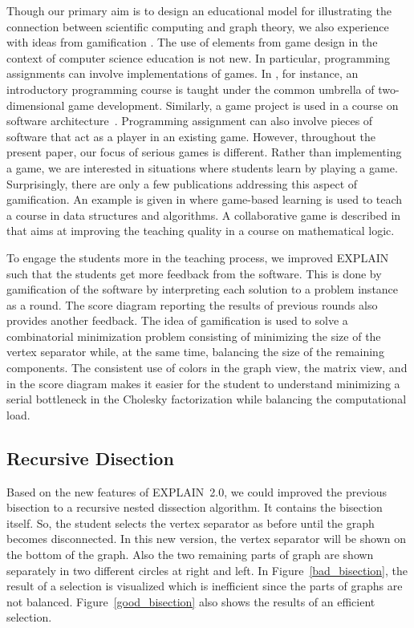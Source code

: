 \documentclass[12pt, oneside]{book}
\begin{document}
Though our primary aim is to design an educational model for illustrating the connection between
scientific computing and graph theory, we also experience with ideas from gamification
\cite{deterding2011:gug,deterding2011}. The use of elements from game design in the context of
computer science education is not new. In particular, programming assignments can involve
implementations of games. In \cite{la2007:gfa}, for instance, an introductory programming course is
taught under the common umbrella of two-dimensional game development. Similarly, a game project is
used in a course on software architecture~\cite{Wang2011:EEU}. Programming assignment can also
involve pieces of software that act as a player in an existing game. However, throughout the
present paper, our focus of serious games is different. Rather than implementing a game, we are
interested in situations where students learn by playing a game. Surprisingly, there are only a few
publications addressing this aspect of gamification. An example is given in
\cite{Hakulinen2011:usg} where game-based learning is used to teach a course in data structures and
algorithms. A collaborative game is described in \cite{shl:bsc} that aims at improving the teaching
quality in a course on mathematical logic.


To engage the students more in the teaching process, we improved EXPLAIN such that the students get
more feedback from the software. This is done by gamification of the software by interpreting each
solution to a problem instance as a round. The score diagram reporting the results of previous
rounds also provides another feedback. The idea of gamification is used to solve a combinatorial
minimization problem consisting of minimizing the size of the vertex separator while, at the same
time, balancing the size of the remaining components. The consistent use of colors in the graph
view, the matrix view, and in the score diagram makes it easier for the student to understand
minimizing a serial bottleneck in the Cholesky factorization while balancing the computational
load.
\subsection{Recursive Disection}
Based on the new features of \mbox{EXPLAIN 2.0}, we could improved the previous
bisection to a recursive nested dissection algorithm. 
It contains the bisection itself. So, the student selects the vertex separator
as before until the graph becomes disconnected. 
In this new version, the vertex separator will be shown on the bottom
of the graph. Also the two remaining parts of graph are shown separately
in two different circles at right and left.
In Figure~\ref{bad_bisection}, the result of a selection is visualized which
is inefficient since the parts of graphs are not balanced. 
Figure~\ref{good_bisection} also shows the results of an efficient selection.
\end{document}

